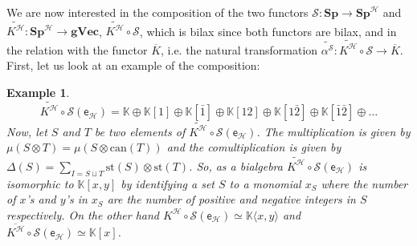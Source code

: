 \documentclass[11pt,reqno]{amsart}
\numberwithin{equation}{section}
\newtheorem{ex}[theorem]{Example}
\def\S{{\mathbb S}}
\def\K{{\mathbb K}}
\def\Sp{{\mathbf{Sp}}}
\def\SpB{{\mathbf{Sp}^{\H}}}
\def\gVec{{\mathbf{gVec}}}
\def\H{{\mathcal{H}}}
\def\eB{{\textsf{e}_{\H}}}
\def\S{{\mathcal{S}}}
\def\Kb{\overline{K}}
\def\KB{K^{\H}}
\def\KBb{\overline{K^{\H}}}
\def\KBt{\widetilde{K^{\H}}}
\def\can{\mathrm{can}}
\def\st{\mathrm{st}}
\def\can{\mathrm{can}}
\begin{document}
We are now interested in the composition of the two functors $\S\colon \Sp\rightarrow \SpB$ and $\KBt\colon \SpB\rightarrow \gVec$, $\KBt\circ\S$, which is bilax since both functors are bilax, and in the relation with the functor $\Kb$, i.e. the natural transformation $\widetilde{\alpha^{\S}}\colon \KBt\circ\S\rightarrow \Kb$. First, let us look at an example of the composition:

\begin{ex}
$$\KBt\circ\S(\eB)=\K\oplus \K[1]\oplus \K[\bar{1}]\oplus \K[12]\oplus \K[1\bar{2}]\oplus \K[\bar{1}\bar{2}]\oplus \dots$$
Now, let $S$ and $T$ be two elements of $\KBt\circ\S(\eB)$. The multiplication is given by $\mu(S\otimes T)=\mu(S\otimes \can(T))$ and the comultiplication is given by $\Delta(S)=\sum_{I=S\sqcup T} \st(S)\otimes \st(T)$. So, as a bialgebra $\KBt\circ\S(\eB)$ is isomorphic to $\K[x,y]$ by identifying a set $S$ to a monomial $x_S$ where the number of $x$'s and $y$'s in $x_S$ are the number of positive and negative integers in $S$ respectively. On the other hand $\KB\circ\S(\eB)\simeq \K\langle x,y\rangle$ and $\KBb\circ\S(\eB)\simeq \K[x]$.
\end{ex}

\end{document}
